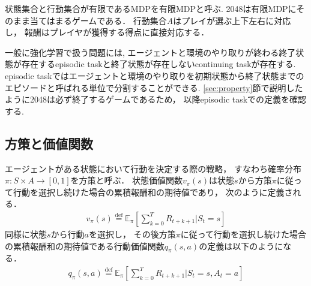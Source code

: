 状態集合と行動集合が有限であるMDPを有限MDPと呼ぶ.
2048は有限MDPにそのまま当てはまるゲームである．
行動集合\textit{A}はプレイが選ぶ上下左右に対応し， 報酬はプレイヤが獲得する得点に直接対応する．

一般に強化学習で扱う問題には, エージェントと環境のやり取りが終わる終了状態が存在するepisodic taskと終了状態が存在しないcontinuing taskが存在する. 
episodic taskではエージェントと環境のやり取りを初期状態から終了状態までのエピソードと呼ばれる単位で分割することができる.
\ref{sec:property}節で説明したように2048は必ず終了するゲームであるため， 以降episodic taskでの定義を確認する. 

\subsection{方策と価値関数}
エージェントがある状態において行動を決定する際の戦略， すなわち確率分布$\pi:S \times A \rightarrow [0,1]$を方策と呼ぶ．
状態価値関数$v_{\pi}(s)$は状態$s$から方策$\pi$に従って行動を選択し続けた場合の累積報酬和の期待値であり， 次のように定義される．
\begin{align}
  v_{\pi}(s) \stackrel{\mathrm{def}}{=} \mathbb{E}_{\pi}\left[\sum_{k=0}^T R_{t+k+1}|S_t=s \right]
\end{align}
同様に状態$s$から行動$a$を選択し， その後方策$\pi$に従って行動を選択し続けた場合の累積報酬和の期待値である行動価値関数$q_{\pi}(s,a)$の定義は以下のようになる．
\begin{align}
  q_{\pi}(s,a) \stackrel{\mathrm{def}}{=} \mathbb{E}_{\pi}\left[\sum_{k=0}^T R_{t+k+1}|S_t=s, A_t=a \right]
\end{align}

